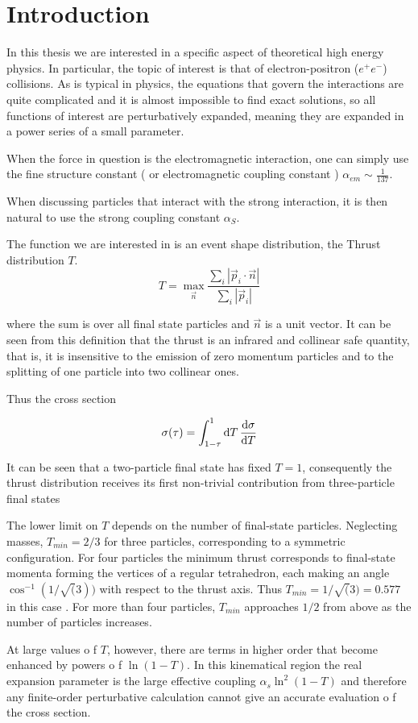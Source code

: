 \documentclass[../main.tex]{subfiles}
\begin{document}
\section{Introduction}

In this thesis we are interested in a specific aspect of theoretical high energy physics. In particular,
the topic of interest is that of electron-positron ($e^+e^-$) collisions. As is typical in physics, the equations that govern
the interactions are quite complicated and it is almost impossible to find exact solutions, so all
functions of interest are perturbatively expanded, meaning they are expanded in a power series
of a small parameter. 

When the force in question is the electromagnetic interaction, one can
simply use the fine structure constant ( or electromagnetic coupling constant ) $\alpha_{em} \sim \frac{1}{137} $.

When discussing particles that interact with the strong interaction, it is then natural to use the strong
coupling constant $ \alpha_S $.

The function we are interested in is an event shape distribution, the Thrust distribution $T$.
\begin{equation} \label{eq:Thrust}
    T = \max_{\vec{n}} \frac{\sum_i |\vec{p}_i \cdot \vec{n}|}{\sum_i |\vec{p}_i|}
\end{equation}

where the sum is over all final state particles and $\vec{n}$ is a unit vector.
It can be seen from this definition that the thrust is an infrared and collinear safe
quantity, that is, it is insensitive to the emission of zero momentum particles and to the splitting of 
one particle into two collinear ones.

Thus the cross section 

\begin{equation}\label{eq:cross_section}
    \sigma(\tau) = \int^1_{1-\tau} \dd{T} \dv{\sigma}{T}
\end{equation}

It can be seen that a two-particle final state has fixed $T = 1$, consequently the thrust
distribution receives its first non-trivial contribution from three-particle final states

The lower limit on $T$ depends on the number of final-state particles.
Neglecting masses, $T_{min} = 2/3$ for three particles, corresponding to a symmetric
configuration. For four particles the minimum thrust corresponds to final-state
momenta forming the vertices of a regular tetrahedron, each making an angle
$\cos^{-1}(1/\sqrt(3))$ with respect to the thrust axis. Thus $T_{min} = 1/\sqrt(3) = 0.577$ in this
case . For more than four particles, $T_{min}$ approaches $1/2$ from above as the number of particles increases.

At large values o f $T$, however, there are terms in higher order that become enhanced by powers o f $\ln(1 - T)$.
In this kinematical region the real expansion parameter is the
large effective coupling $\alpha_s \ln^2( 1 - T)$ and therefore
any finite-order perturbative calculation cannot give an accurate evaluation o f the cross section.
\end{document}
